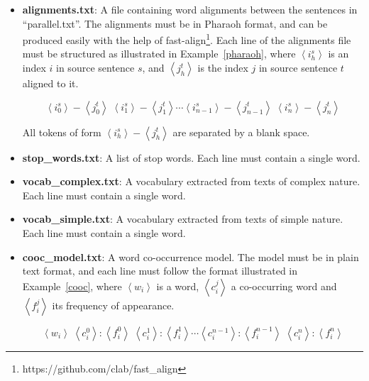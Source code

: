 \begin{itemize}
	\item \textbf{alignments.txt}: A file containing word alignments between the sentences in ``parallel.txt''. The alignments must be in Pharaoh format, and can be produced easily with the help of fast-align\footnote{https://github.com/clab/fast\_align}. Each line of the alignments file must be structured as illustrated in Example~\ref{pharaoh}, where $\left \langle i_{h}^{s} \right \rangle$ is an index $i$ in source sentence $s$, and $\left \langle j_{h}^{t} \right \rangle$ is the index $j$ in source sentence $t$ aligned to it.

\begin{equation}
\label{pharaoh}
\left \langle i_{0}^{s} \right \rangle\! -\! \left \langle j_{0}^{t} \right \rangle\; \left \langle i_{1}^{s} \right \rangle\! -\! \left \langle j_{1}^{t} \right \rangle\cdots\left \langle i_{n-1}^{s} \right \rangle\! -\! \left \langle j_{n-1}^{t} \right \rangle\; \left \langle i_{n}^{s} \right \rangle\! -\! \left \langle j_{n}^{t} \right \rangle
\end{equation}

All tokens of form $\left \langle i_{h}^{s} \right \rangle\! -\! \left \langle j_{h}^{t} \right \rangle$ are separated by a blank space.
	
	\item \textbf{stop\_words.txt}: A list of stop words. Each line must contain a single word.
	
	\item \textbf{vocab\_complex.txt}: A vocabulary extracted from texts of complex nature. Each line must contain a single word.
	
	\item \textbf{vocab\_simple.txt}: A vocabulary extracted from texts of simple nature. Each line must contain a single word.
	
	\item \textbf{cooc\_model.txt}: A word co-occurrence model. The model must be in plain text format, and each line must follow the format illustrated in Example~\ref{cooc}, where $\left\langle w_{i} \right\rangle$ is a word, $\left\langle c_{i}^{j} \right\rangle$ a co-occurring word and $\left\langle f_{i}^{j} \right\rangle$ its frequency of appearance.

\begin{equation}
\label{cooc}
\left\langle w_{i} \right\rangle\; \left\langle c_{i}^{0} \right\rangle\!:\!\left\langle f_{i}^{0} \right\rangle\;\left\langle c_{i}^{1} \right\rangle\!:\!\left\langle f_{i}^{1} \right\rangle\cdots\left\langle c_{i}^{n-1} \right\rangle\!:\!\left\langle f_{i}^{n-1} \right\rangle \; \left\langle c_{i}^{n} \right\rangle\!:\!\left\langle f_{i}^{n} \right\rangle
\end{equation}


\end{itemize}
